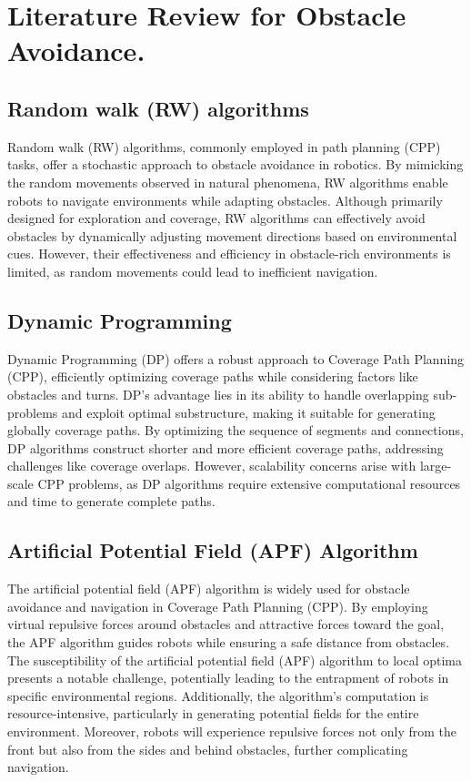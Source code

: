 \section{Literature Review for Obstacle Avoidance.}


\subsection{Random walk (RW) algorithms}

Random walk (RW) algorithms, commonly employed in path planning (CPP) tasks, offer a stochastic approach to obstacle avoidance in robotics. By mimicking the random movements observed in natural phenomena, RW algorithms enable robots to navigate environments while adapting obstacles. Although primarily designed for exploration and coverage, RW algorithms can effectively avoid obstacles by dynamically adjusting movement directions based on environmental cues. However, their effectiveness and efficiency in obstacle-rich environments is limited, as random movements could lead to inefficient navigation.

\subsection{Dynamic Programming}
Dynamic Programming (DP) offers a robust approach to Coverage Path Planning (CPP), efficiently optimizing coverage paths while considering factors like obstacles and turns. DP's advantage lies in its ability to handle overlapping sub-problems and exploit optimal substructure, making it suitable for generating globally coverage paths. By optimizing the sequence of segments and connections, DP algorithms construct shorter and more efficient coverage paths, addressing challenges like coverage overlaps. However, scalability concerns arise with large-scale CPP problems, as DP algorithms require extensive computational resources and time to generate complete paths. 


\subsection{Artificial Potential Field (APF) Algorithm}

The artificial potential field (APF) algorithm is widely used for obstacle avoidance and navigation in Coverage Path Planning (CPP). By employing virtual repulsive forces around obstacles and attractive forces toward the goal, the APF algorithm guides robots while ensuring a safe distance from obstacles. The susceptibility of the artificial potential field (APF) algorithm to local optima presents a notable challenge, potentially leading to the entrapment of robots in specific environmental regions. Additionally, the algorithm's computation is resource-intensive, particularly in generating potential fields for the entire environment. Moreover, robots will experience repulsive forces not only from the front but also from the sides and behind obstacles, further complicating navigation.

